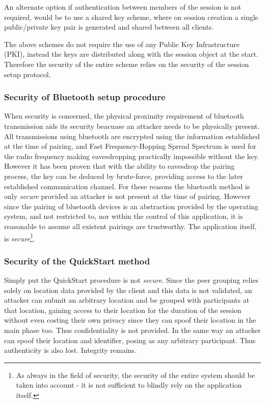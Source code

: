 An alternate option if authentication between members of the session is not required, would be to use a shared key scheme, where on session creation a single public/private key pair is generated and shared between all clients.

The above schemes do not require the use of any Public Key Infrastructure (PKI), instead the keys are distributed along with the session object at the start. Therefore the security of the entire scheme relies on the security of the session setup protocol.

\subsubsection{Security of Bluetooth setup procedure}
When security is concerned, the physical proximity requirement of bluetooth transmission aids its security beacuase an attacker needs to be physically present. All transmissions using bluetooth are encrypted using the information established at the time of pairing, and Fast Frequency-Hopping Spread Spectrum is used for the radio frequency making eavesdropping practically impossible without the key.\cite{BTsec} However it has been proven that with the ability to eavesdrop the pairing process, the key can be deduced by brute-force, providing access to the later established communication channel.\cite{BTcrack} For these reasons the bluetooth method is only \emph{secure} provided an attacker is not present at the time of pairing. However since the pairing of bluetooth devices is an abstraction provided by the operating system, and not restricted to, nor within the control of this application, it is reasonable to assume all existent pairings are trustworthy. The application itself, is \emph{secure}\footnote{As always in the field of security, the security of the entire system should be taken into account - it is not sufficient to blindly rely on the application itself.}.

\subsubsection{Security of the QuickStart method}
\label{sec}
Simply put the QuickStart procedure is not \emph{secure}. Since the peer grouping relies solely on location data provided by the client and this data is not validated, an attacker can submit an arbitrary location and be grouped with participants at that location, gaining access to their location for the duration of the session without even costing their own privacy since they can spoof their location in the main phase too. Thus confidentiality is not provided. In the same way an attacker can spoof their location and identifier, posing as any arbitrary participant. Thus authenticity is also lost. Integrity remains.


